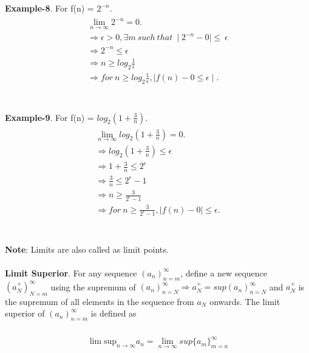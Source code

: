 \documentclass[a4paper]{article}
\begin{document}
\\
\\
\textbf{Example-8}. For f(n) = $2^{-n}$.\\
\begin{align}
\begin{split}
\lim_{n \to \infty}2^{-n} = 0.\\
\Rightarrow \epsilon > 0, \exists m \ such\ that\ \mid 2^{-n}-0 \mid \leq\ \epsilon\\
\Rightarrow 2^{-n} \leq \epsilon\\
\Rightarrow n \geq log_2\frac{1}{\epsilon}\\
\Rightarrow for\ n \geq log_2\frac{1}{\epsilon}, \mid f(n)-0\leq \epsilon \mid.
\end{split}
\end{align}
\\
\\
\textbf{Example-9}. For f(n) = $log_2(1+\frac{3}{n})$.\\
\begin{align}
\begin{split}
\lim_{n \to \infty} log_2(1+\frac{3}{n})= 0.\\
\Rightarrow log_2(1+\frac{3}{n})\leq\epsilon\\
\Rightarrow 1+\frac{3}{n} \leq 2^\epsilon\\
\Rightarrow \frac{3}{n} \leq 2^\epsilon - 1 \\
\Rightarrow n \geq \frac{3}{2^\epsilon -1}\\
\Rightarrow for\ n \geq \frac{3}{2^\epsilon -1}, \mid f(n)-0 \mid \leq \epsilon.
\end{split}
\end{align}
\\
\\
\textbf{Note}: Limits are also called as limit points.
\\
\\
\textbf{Limit Superior}.
For any sequence $(a_n)^\infty_{n=m}$, define a new sequence $(a_N^+)^\infty_{N=m}$ using the supremum of  $(a_n)^\infty_{n=N} \Rightarrow a_N^+ = sup (a_n)^\infty_{n=N}$ and $a_N^+$ is the supremum of all elements in the sequence from $a_N$ onwards. The limit superior of $(a_n)^\infty_{n=m}$ is defined as 
	\\
	\\
	\begin{align}
	\begin{split}
	\lim\text{sup}_{n \to \infty} a_n = \lim_{n \to \infty} sup \{a_m\}^\infty_{m=n}
	\end{split}
	\end{align}
\end{document}
